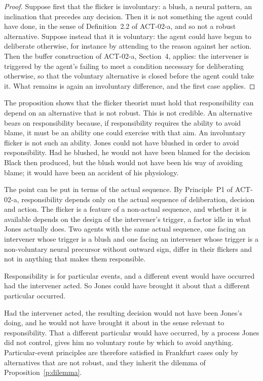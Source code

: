 \documentclass{situationist-preprint}
\begin{document}
\begin{proof}
Suppose first that the flicker is involuntary: a blush, a neural pattern, an inclination that precedes any decision. Then it is not something the agent could have done, in the sense of Definition~2.2 of ACT-02-a, and so not a robust alternative. Suppose instead that it is voluntary: the agent could have begun to deliberate otherwise, for instance by attending to the reason against her action. Then the buffer construction of ACT-02-a, Section~4, applies: the intervener is triggered by the agent's failing to meet a condition necessary for deliberating otherwise, so that the voluntary alternative is closed before the agent could take it. What remains is again an involuntary difference, and the first case applies.
\end{proof}

The proposition shows that the flicker theorist must hold that responsibility can depend on an alternative that is not robust. This is not credible. An alternative bears on responsibility because, if responsibility requires the ability to avoid blame, it must be an ability one could exercise with that aim. An involuntary flicker is not such an ability. Jones could not have blushed in order to avoid responsibility. Had he blushed, he would not have been blamed for the decision Black then produced, but the blush would not have been his way of avoiding blame; it would have been an accident of his physiology.

The point can be put in terms of the actual sequence. By Principle~P1 of ACT-02-a, responsibility depends only on the actual sequence of deliberation, decision and action. The flicker is a feature of a non-actual sequence, and whether it is available depends on the design of the intervener's trigger, a factor idle in what Jones actually does. Two agents with the same actual sequence, one facing an intervener whose trigger is a blush and one facing an intervener whose trigger is a non-voluntary neural precursor without outward sign, differ in their flickers and not in anything that makes them responsible.

\begin{objection}
Responsibility is for particular events, and a different event would have occurred had the intervener acted. So Jones could have brought it about that a different particular occurred.
\end{objection}

\begin{reply}
Had the intervener acted, the resulting decision would not have been Jones's doing, and he would not have brought it about in the sense relevant to responsibility. That a different particular would have occurred, by a process Jones did not control, gives him no voluntary route by which to avoid anything. Particular-event principles are therefore satisfied in Frankfurt cases only by alternatives that are not robust, and they inherit the dilemma of Proposition~\ref{p:dilemma}.
\end{reply}
\end{document}
